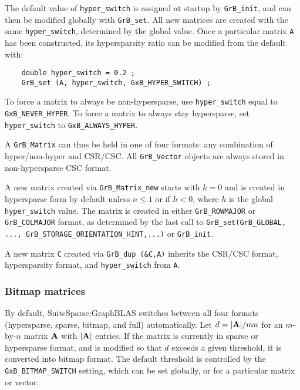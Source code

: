 The default value of \verb'hyper_switch' is assigned at startup by
\verb'GrB_init', and can then be modified globally with \verb'GrB_set'.  All
new matrices are created with the same \verb'hyper_switch', determined by the
global value.  Once a particular matrix \verb'A' has been constructed, its
hypersparsity ratio can be modified from the default with:

    {\footnotesize
    \begin{verbatim}
    double hyper_switch = 0.2 ;
    GrB_set (A, hyper_switch, GxB_HYPER_SWITCH) ; \end{verbatim}}

To force a matrix to always be non-hypersparse, use \verb'hyper_switch' equal to
\verb'GxB_NEVER_HYPER'.  To force a matrix to always stay hypersparse, set
\verb'hyper_switch' to \verb'GxB_ALWAYS_HYPER'.

A \verb'GrB_Matrix' can thus be held in one of four formats: any combination of
hyper/non-hyper and CSR/CSC.  All \verb'GrB_Vector' objects are always stored
in non-hypersparse CSC format.

A new matrix created via \verb'GrB_Matrix_new' starts with $k=0$ and is created
in hypersparse form by default unless $n \le 1$ or if $h<0$, where $h$ is the
global \verb'hyper_switch' value.  The matrix is created in either
\verb'GrB_ROWMAJOR' or \verb'GrB_COLMAJOR' format, as determined by the last call
to
\verb'GrB_set(GrB_GLOBAL,' \verb'..., GrB_STORAGE_ORIENTATION_HINT,...)' or \verb'GrB_init'.

A new matrix \verb'C' created via \verb'GrB_dup (&C,A)' inherits the CSR/CSC
format, hypersparsity format, and \verb'hyper_switch' from \verb'A'.

\subsubsection{Bitmap matrices}
\label{bitmap_switch}

By default, SuiteSparse:GraphBLAS switches between all four formats
(hypersparse, sparse, bitmap, and full) automatically.  Let $d = |{\bf A}|/mn$
for an $m$-by-$n$ matrix $\bf A$ with $|{\bf A}|$ entries.  If the matrix is
currently in sparse or hypersparse format, and is modified so that $d$ exceeds
a given threshold, it is converted into bitmap format.  The default threshold
is controlled by the \verb'GxB_BITMAP_SWITCH' setting, which can be set
globally, or for a particular matrix or vector.

